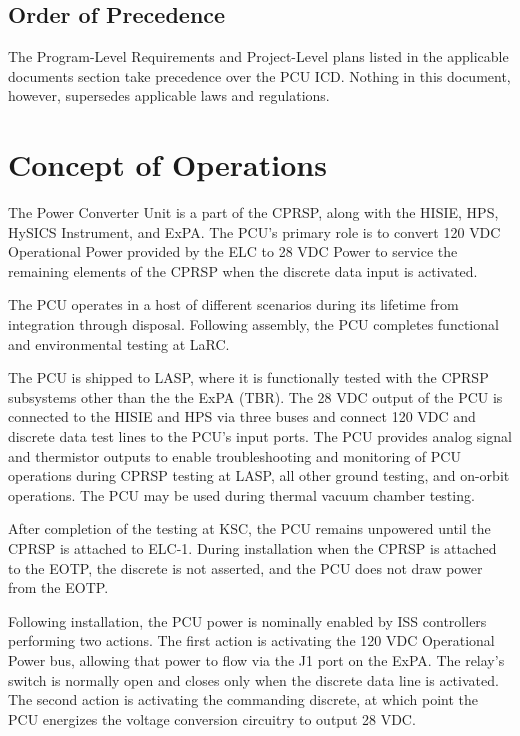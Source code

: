 \section{Order of Precedence }
\label{orderofprecedence}

The Program-Level Requirements and Project-Level plans listed in the applicable documents section take precedence over the \gls{PCU} \gls{ICD}. Nothing in this document, however, supersedes applicable laws and regulations.

\chapter{Concept of Operations  }
\label{conops}

The Power Converter Unit is a part of the \gls{CPRSP}, along with the \gls{HISIE}, \gls{HPS}, \gls{HySICS} Instrument, and \gls{ExPA}. The \gls{PCU}'s primary role is to convert 120 \gls{VDC} Operational Power provided by the \gls{ELC} to 28 \gls{VDC} Power to service the remaining elements of the \gls{CPRSP} when the discrete data input is activated.

The \gls{PCU} operates in a host of different scenarios during its lifetime from integration through disposal. Following assembly, the \gls{PCU} completes functional and environmental testing at \gls{LaRC}.

The \gls{PCU} is shipped to \gls{LASP}, where it is functionally tested with the \gls{CPRSP} subsystems other than the the \gls{ExPA} (TBR\label{tbx_1}). The 28 \gls{VDC} output of the \gls{PCU} is connected to the \gls{HISIE} and \gls{HPS} via three buses and connect 120 \gls{VDC} and discrete data test lines to the \gls{PCU}'s input ports. The \gls{PCU} provides analog signal and thermistor outputs to enable troubleshooting and monitoring of \gls{PCU} operations during \gls{CPRSP} testing at \gls{LASP}, all other ground testing, and on-orbit operations. The \gls{PCU} may be used during thermal vacuum chamber testing.

After completion of the testing at \gls{KSC}, the \gls{PCU} remains unpowered until the \gls{CPRSP} is attached to \gls{ELC}-1. During installation when the \gls{CPRSP} is attached to the \gls{EOTP}, the discrete is not asserted, and the \gls{PCU} does not draw power from the \gls{EOTP}.

Following installation, the \gls{PCU} power is nominally enabled by \gls{ISS} controllers performing two actions. The first action is activating the 120 \gls{VDC} Operational Power bus, allowing that power to flow via the J1 port on the \gls{ExPA}. The relay's switch is normally open and closes only when the discrete data line is activated. The second action is activating the commanding discrete, at which point the \gls{PCU} energizes the voltage conversion circuitry to output 28 \gls{VDC}.

